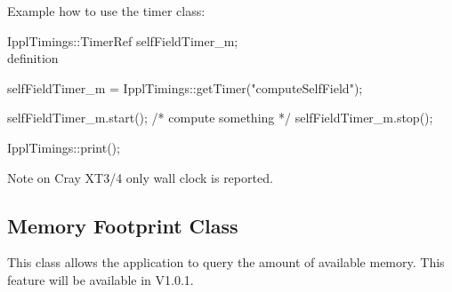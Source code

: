 \clearpage

Example how to use the timer class: \\
\begin{code}

IpplTimings::TimerRef selfFieldTimer_m;    \\ definition

selfFieldTimer_m = IpplTimings::getTimer("computeSelfField");  
 
selfFieldTimer_m.start(); 
    /* compute something */
selfFieldTimer_m.stop();

IpplTimings::print();

\end{code}
Note on Cray XT3/4 only wall clock is reported. 

\subsection{Memory Footprint Class}
This class allows the application to query the amount of 
available memory. This feature will be available in V1.0.1.



\begin{verbatim}


\end{verbatim}





\begin{verbatim}


\end{verbatim}

